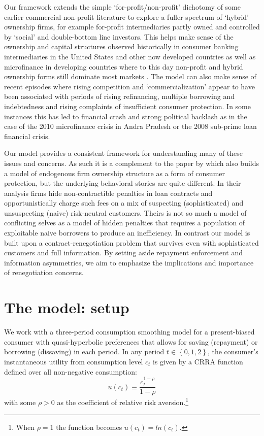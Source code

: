 \documentclass[11pt,english]{article}
\theoremstyle{plain}
\theoremstyle{definition}
\begin{document}
Our framework extends the simple `for-profit/non-profit' dichotomy
of some earlier commercial non-profit literature to explore
a fuller spectrum of `hybrid' ownership firms, for example for-profit intermediaries partly owned and controlled by `social' and double-bottom line investors. This helps make sense of the ownership and
capital structures observed historically in consumer banking intermediaries
in the United States and other now developed countries as well as
microfinance in developing countries where to this day non-profit
and hybrid ownership forms still dominate most markets \citep{cull2009,conning2011}. The model
can also make sense of recent episodes where rising competition and
`commercialization' appear to have been associated with periods of
rising refinancing, multiple borrowing and indebtedness and rising
complaints of insufficient consumer protection. In some instances
this has led to financial crash and strong political backlash as in
the case of the 2010 microfinance crisis in Andra Pradesh or the 2008
sub-prime loan financial crisis.

Our model provides a consistent framework for understanding many of
these issues and concerns. As such it is a complement to the paper
by \citet{bubb2013} which also builds a model of endogenous
firm ownership structure as a form of consumer protection, but the
underlying behavioral stories are quite different. In their analysis
firms hide non-contractible penalties in loan contracts and opportunistically
charge such fees on a mix of suspecting (sophisticated) and unsuspecting
(naive) risk-neutral customers. Theirs is not so much a model of conflicting
selves as a model of hidden penalties that requires a population of
exploitable naive borrowers to produce an inefficiency. In contrast
our model is built upon a contract-renegotiation problem that survives
even with sophisticated customers and full information. By setting
aside repayment enforcement and information asymmetries, we aim to
emphasize the implications and importance of renegotiation concerns.

\section{The model: setup}

We work with a three-period consumption smoothing model for a present-biased
consumer with quasi-hyperbolic preferences that allows for saving
(repayment) or borrowing (dissaving) in each period. In any period
$t\in\left\{ 0,1,2\right\} $, the consumer's instantaneous utility
from consumption level $c_{t}$ is given by a CRRA function defined
over all non-negative consumption: 
\begin{equation}
u\left(c_{t}\right)\equiv\frac{c_{t}^{1-\rho}}{1-\rho}
\end{equation}
with some $\rho>0$ as the coefficient of relative risk aversion.\footnote{When $\rho=1$ the function becomes $u(c_{t})=ln(c_{t})$.}
\end{document}
